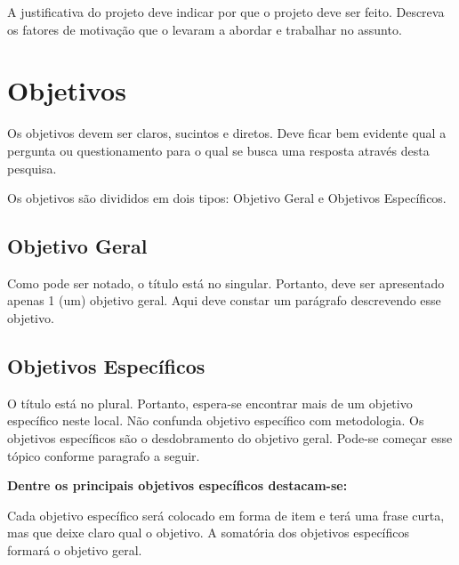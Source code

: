 \documentclass[
    12pt,               %
    a4paper,            %
    english,            %
    brazil,             %
    ]{article}
\begin{document}
A justificativa do projeto deve indicar por que o projeto deve ser feito. Descreva os fatores de motivação que o levaram a abordar e trabalhar no assunto.

\section{Objetivos}



Os objetivos devem ser claros, sucintos e diretos. Deve ficar bem evidente qual a pergunta ou questionamento para o qual se busca uma resposta através desta pesquisa.

Os objetivos são divididos em dois tipos: Objetivo Geral e Objetivos Específicos.

\subsection{Objetivo Geral}

Como pode ser notado, o título está no singular. Portanto, deve ser apresentado apenas 1 (um) objetivo geral. Aqui deve constar um parágrafo descrevendo esse objetivo.

\subsection{Objetivos Específicos}

O título está no plural. Portanto, espera-se encontrar mais de um objetivo específico neste local. Não confunda objetivo específico com metodologia.
Os objetivos específicos são o desdobramento do objetivo geral. Pode-se começar esse tópico conforme paragrafo a seguir.

{\bf Dentre os principais objetivos específicos destacam-se: }

Cada objetivo específico será colocado em forma de item e terá uma frase curta, mas que deixe claro qual o objetivo.
A somatória dos objetivos específicos formará o objetivo geral.


\end{document}
